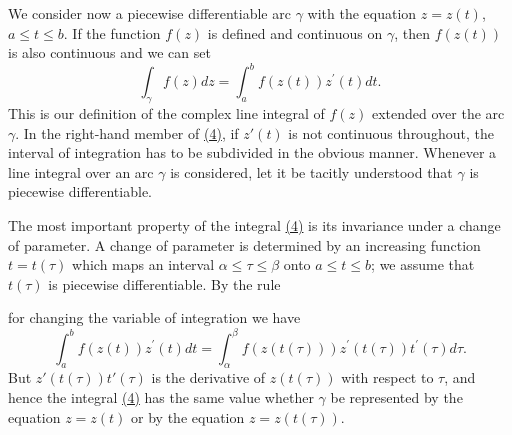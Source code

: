 We consider now a piecewise differentiable arc $\gamma$ with the equation $z = z(t)$, $a \leq t \leq b$. If the function $f(z)$ is defined and continuous on $\gamma$, then $f(z(t))$ is also continuous and we can set
\begin{equation*}
\int_ {\gamma} f (z) d z = \int_ {a} ^ {b} f (z (t)) z ^ {\prime} (t) d t.\tag{4}\label{eq:4.4}
\end{equation*}
This is our definition of the complex line integral of $f(z)$ extended over the arc $\gamma$. In the right-hand member of \hyperref[eq:4.4]{(4)}, if $z'(t)$ is not continuous throughout, the interval of integration has to be subdivided in the obvious manner. Whenever a line integral over an arc $\gamma$ is considered, let it be tacitly understood that $\gamma$ is piecewise differentiable.

The most important property of the integral \hyperref[eq:4.4]{(4)} is its invariance under a change of parameter. A change of parameter is determined by an increasing function $t = t(\tau)$ which maps an interval $\alpha \leq \tau \leq \beta$ onto $a \leq t \leq b$; we assume that $t(\tau)$ is piecewise differentiable. By the rule

\begingroup\renewcommand{\thefootnote}{}\endgroup

for changing the variable of integration we have
\begin{equation*}
\int_ {a} ^ {b} f (z (t)) z ^ {\prime} (t) d t = \int_ {\alpha} ^ {\beta} f (z (t (\tau))) z ^ {\prime} (t (\tau)) t ^ {\prime} (\tau) d \tau .
\end{equation*}
But $z'(t(\tau))t'(\tau)$ is the derivative of $z(t(\tau))$ with respect to $\tau$, and hence the integral \hyperref[eq:4.4]{(4)} has the same value whether $\gamma$ be represented by the equation $z = z(t)$ or by the equation $z = z(t(\tau))$.


